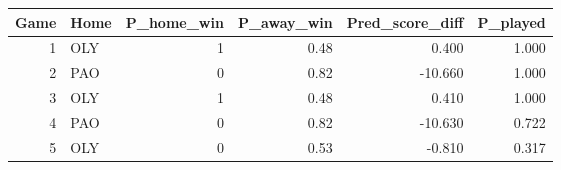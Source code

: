 \begin{table}[ht]
\centering
\begin{tabular}{rlrrrr}
  \hline
Game & Home & P\_home\_win & P\_away\_win & Pred\_score\_diff & P\_played \\ 
  \hline
1 & OLY & 1 & 0.48 & 0.400 & 1.000 \\ 
  2 & PAO & 0 & 0.82 & -10.660 & 1.000 \\ 
  3 & OLY & 1 & 0.48 & 0.410 & 1.000 \\ 
  4 & PAO & 0 & 0.82 & -10.630 & 0.722 \\ 
  5 & OLY & 0 & 0.53 & -0.810 & 0.317 \\ 
   \hline
\end{tabular}
\end{table}
